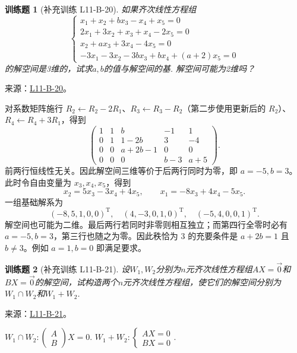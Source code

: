 \documentclass[UTF8,12pt,a4paper,fontset=fandol]{ctexart}
\newtheorem{exercise}{训练题}[section]
\begin{document}
\begin{exercise}[补充训练 L11-B-20]\label{prob:L11-B-20}
如果齐次线性方程组\[\begin{cases}
                x_1+x_2+bx_3-x_4+x_5=0   \\
                2x_1+3x_2+x_3+x_4-2x_5=0 \\
                x_2+ax_3+3x_4-4x_5=0     \\
                -3x_1-3x_2-3bx_3+bx_4+(a+2)x_5=0
            \end{cases}\]的解空间是3维的，试求$a,b$的值与解空间的基. 解空间可能为2维吗？
\end{exercise}
\noindent 来源：\href{https://github.com/yhwu-is/Linear-Algebra-Left-Undone/blob/new/%E8%AE%B2%E4%B9%89/%E4%B8%93%E9%A2%98/11%20%E6%9C%9D%E8%8A%B1%E5%A4%95%E6%8B%BE.tex}{L11-B-20}。
\begin{solve}
对系数矩阵施行 $R_2\leftarrow R_2-2R_1$、$R_3\leftarrow R_3-R_2$（第二步使用更新后的 $R_2$）、$R_4\leftarrow R_4+3R_1$，得到
\[\begin{pmatrix}1&1&b&-1&1\\0&1&1-2b&3&-4\\0&0&a+2b-1&0&0\\0&0&0&b-3&a+5\end{pmatrix}.\]
前两行恒线性无关。因此解空间三维等价于后两行同时为零，即 $a=-5,b=3$。此时令自由变量为 $x_3,x_4,x_5$，得到
\[x_2=5x_3-3x_4+4x_5,\qquad x_1=-8x_3+4x_4-5x_5.\]
一组基础解系为
\[(-8,5,1,0,0)^{\mathrm T},\quad(4,-3,0,1,0)^{\mathrm T},\quad(-5,4,0,0,1)^{\mathrm T}.\]
解空间也可能为二维。最后两行若同时非零则相互独立；而第四行全零时必有 $a=-5,b=3$，第三行也随之为零。因此秩恰为 $3$ 的充要条件是 $a+2b=1$ 且 $b\ne3$。例如 $a=1,b=0$ 即满足要求。
\end{solve}

\begin{exercise}[补充训练 L11-B-21]\label{prob:L11-B-21}
设$W_1,W_2$分别为$n$元齐次线性方程组$AX=\vec{0}$和$BX=\vec{0}$的解空间，试构造两个$n$元齐次线性方程组，使它们的解空间分别为$W_1 \cap W_2$和$W_1+W_2$.
\end{exercise}
\noindent 来源：\href{https://github.com/yhwu-is/Linear-Algebra-Left-Undone/blob/new/%E8%AE%B2%E4%B9%89/%E4%B8%93%E9%A2%98/11%20%E6%9C%9D%E8%8A%B1%E5%A4%95%E6%8B%BE.tex}{L11-B-21}。
\begin{solve}
$W_1\cap W_2:\begin{pmatrix}
                  A \\ B
              \end{pmatrix}X=0$. \qquad
          $W_1+ W_2:\begin{cases}
                  AX = 0 \\
                  BX = 0
              \end{cases}$.
\end{solve}
\end{document}
